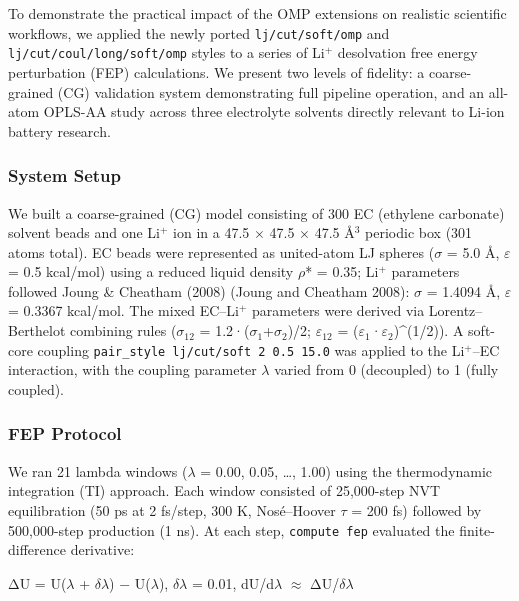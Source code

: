 \documentclass[
  11pt,
]{article}
\begin{document}
To demonstrate the practical impact of the OMP extensions on realistic
scientific workflows, we applied the newly ported
\texttt{lj/cut/soft/omp} and \texttt{lj/cut/coul/long/soft/omp} styles
to a series of Li\(^{+}\) desolvation free energy perturbation (FEP)
calculations. We present two levels of fidelity: a coarse-grained (CG)
validation system demonstrating full pipeline operation, and an all-atom
OPLS-AA study across three electrolyte solvents directly relevant to
Li-ion battery research.

\subsubsection{System Setup}\label{system-setup}

We built a coarse-grained (CG) model consisting of 300 EC (ethylene
carbonate) solvent beads and one Li\(^{+}\) ion in a 47.5 \(\times\)
47.5 \(\times\) 47.5 \AA{}\(^{3}\) periodic box (301 atoms total). EC
beads were represented as united-atom LJ spheres (\(\sigma\) = 5.0
\AA{}, \(\varepsilon\) = 0.5 kcal/mol) using a reduced liquid density
\(\rho\)* = 0.35; Li\(^{+}\) parameters followed Joung \& Cheatham
(2008) (Joung and Cheatham 2008): \(\sigma\) = 1.4094 \AA{},
\(\varepsilon\) = 0.3367 kcal/mol. The mixed EC--Li\(^{+}\) parameters
were derived via Lorentz--Berthelot combining rules (\(\sigma\)\(_{12}\)
= 1.2·(\(\sigma\)\(_{1}\)+\(\sigma\)\(_{2}\))/2;
\(\varepsilon\)\(_{12}\) =
(\(\varepsilon\)\(_{1}\)·\(\varepsilon\)\(_{2}\))\^{}(1/2)). A soft-core
coupling \texttt{pair\_style\ lj/cut/soft\ 2\ 0.5\ 15.0} was applied to
the Li\(^{+}\)--EC interaction, with the coupling parameter \(\lambda\)
varied from 0 (decoupled) to 1 (fully coupled).

\subsubsection{FEP Protocol}\label{fep-protocol}

We ran 21 lambda windows (\(\lambda\) = 0.00, 0.05, \ldots, 1.00) using
the thermodynamic integration (TI) approach. Each window consisted of
25,000-step NVT equilibration (50 ps at 2 fs/step, 300 K, Nosé--Hoover
\(\tau\) = 200 fs) followed by 500,000-step production (1 ns). At each
step, \texttt{compute\ fep} evaluated the finite-difference derivative:

ΔU = U(\(\lambda\) + \(\delta\)\(\lambda\)) − U(\(\lambda\)),
\(\delta\)\(\lambda\) = 0.01, dU/d\(\lambda\) \(\approx\)
ΔU/\(\delta\)\(\lambda\)
\end{document}
